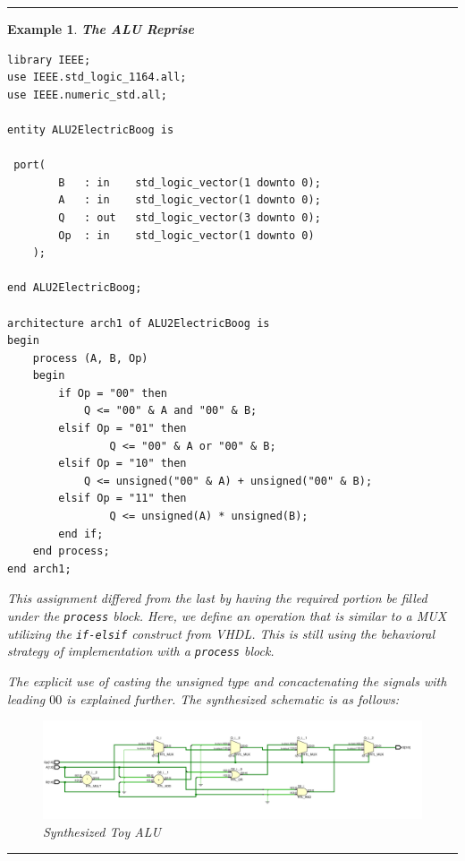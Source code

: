 \documentclass[12pt]{article}
\newtheorem{example}{Example}
\newenvironment{examp}
{
	\vspace{.5cm}
	\hrule
\begin{example}\upshape}
	{\hrule
		\vspace{0.5cm}
\end{example}}
\begin{document}
\begin{examp}
	\vspace{.5cm}
	\textbf{The ALU Reprise}\\
	\begin{verbatim}
library IEEE;
use IEEE.std_logic_1164.all;
use IEEE.numeric_std.all;

entity ALU2ElectricBoog is 

 port(
		B	: in	std_logic_vector(1 downto 0);
		A	: in	std_logic_vector(1 downto 0);
		Q	: out	std_logic_vector(3 downto 0);
		Op	: in	std_logic_vector(1 downto 0)
	);

end ALU2ElectricBoog;

architecture arch1 of ALU2ElectricBoog is
begin
	process (A, B, Op)
    begin
    	if Op = "00" then
    		Q <= "00" & A and "00" & B;
    	elsif Op = "01" then
                Q <= "00" & A or "00" & B;
    	elsif Op = "10" then
    		Q <= unsigned("00" & A) + unsigned("00" & B);
    	elsif Op = "11" then
                Q <= unsigned(A) * unsigned(B);
    	end if;
    end process;
end arch1;

	\end{verbatim}
	This assignment differed from the last by having the required portion be
	filled under the \texttt{process} block. Here, we define an operation that is
	similar to a MUX utilizing the \texttt{if-elsif} construct from VHDL. 
	This is still using the \textit{behavioral} strategy of implementation with a
	\texttt{process} block. 
	
	The explicit use of casting the unsigned type and concactenating the signals
	with leading \(00\) is explained further. The synthesized schematic is as
	follows:
	\begin{figure}[H]
		\centering
		\includegraphics[scale=.35]{examp122}
		\caption{Synthesized Toy ALU}
	\end{figure}
\end{examp}
\end{document}
